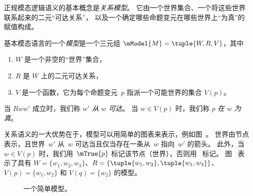\documentclass[../../../include/open-logic-section]{subfiles}
\begin{document}


正规模态逻辑语义的基本概念是\emph{关系模型}。
它由一个世界集合、一个将这些世界联系起来的二元“可达关系”，
以及一个确定哪些命题变元在哪些世界上“为真”的赋值构成。

\begin{defn}
  基本模态语言的一个\emph{模型}是一个三元组 $\mModel{M}
  = \tuple{W, R, V}$，其中
  \begin{enumerate}
  \item $W$ 是一个非空的“世界”集合，
  \item $R$ 是 $W$ 上的二元可达关系，
  \item $V$ 是一个函数，它为每个命题变元~$p$ 指派一个可能世界的集合 $V(p)$。
  \end{enumerate}
  当 $Rww'$ 成立时，我们称 $w'$ \emph{从 $w$ 可达}。
  当 $w \in V(p)$ 时，我们称 $p$ \emph{在 $w$ 为真}。
\end{defn}

关系语义的一大优势在于，模型可以用简单的图表来表示，例如图~。
世界由节点表示，且世界~$w'$ 从~$w$ 可达当且仅当存在一条从~$w$ 指向~$w'$ 的箭头。
此外，当 $w \in V(p)$ 时，我们用~$\mTrue{p}$ 标记该节点（世界），否则用~ 标记。
图~ 表示了具有 $W = \{w_1, w_2, w_3\}$、$R = \{\tuple{w_1, w_2},\tuple{w_1,
  w_3}\}$、$V(p) = \{w_1, w_2\}$ 和 $V(q) = \{w_2\}$ 的模型。

\begin{figure}
  \begin{center}
  \end{center}
  \caption{一个简单模型。}
\end{figure}
\end{document}

